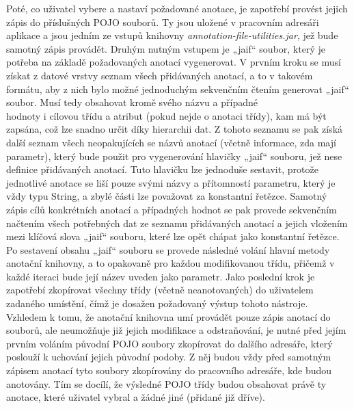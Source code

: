 \documentclass{projekt}
\begin{document}
Poté, co uživatel vybere a nastaví požadované anotace, je zapotřebí provést jejich zápis do příslušných POJO souborů. Ty jsou uložené v pracovním adresáři aplikace a jsou jedním ze vstupů knihovny {\it annotation-file-utilities.jar}, jež bude samotný zápis provádět. Druhým nutným vstupem je „jaif“ soubor, který je potřeba na základě požadovaných anotací vygenerovat. V prvním kroku se musí získat z datové vrstvy seznam všech přidávaných anotací, a to v takovém formátu, aby z nich bylo možné jednoduchým sekvenčním čtením generovat „jaif“ soubor. Musí tedy obsahovat kromě svého názvu a případné \\hodnoty i cílovou třídu a atribut (pokud nejde o anotaci třídy), kam má být zapsána, což lze snadno určit díky hierarchii dat. Z tohoto seznamu se pak získá další seznam všech neopakujících se názvů anotací (včetně informace, zda mají parametr), který bude použit pro vygenerování hlavičky „jaif“ souboru, jež nese definice přidávaných anotací. Tuto hlavičku lze jednoduše sestavit, protože jednotlivé anotace se liší pouze svými názvy a přítomností parametru, který je vždy typu String, a zbylé části lze považovat za konstantní řetězce. Samotný zápis cílů konkrétních anotací a případných hodnot se pak provede sekvenčním načtením všech potřebných dat ze seznamu přidávaných anotací a jejich vložením mezi klíčová slova „jaif“ souboru, které lze opět chápat jako konstantní řetězce. Po sestavení obsahu „jaif“ souboru se provede následné volání hlavní metody anotační knihovny, a to opakovaně pro každou modifikovanou třídu, přičemž v každé iteraci bude její název uveden jako parametr. Jako poslední krok je zapotřebí zkopírovat všechny třídy (včetně neanotovaných) do uživatelem zadaného umístění, čímž je dosažen požadovaný výstup tohoto nástroje.\\
Vzhledem k tomu, že anotační knihovna umí provádět pouze zápis anotací do souborů, ale neumožňuje již jejich modifikace a odstraňování, je nutné před jejím prvním voláním původní POJO soubory zkopírovat do dalšího adresáře, který poslouží k uchování jejich původní podoby. Z něj budou vždy před samotným zápisem anotací tyto soubory zkopírovány do pracovního adresáře, kde budou anotovány. Tím se docílí, že výsledné POJO třídy budou obsahovat právě ty anotace, které uživatel vybral a žádné jiné (přidané již dříve).
\end{document}
